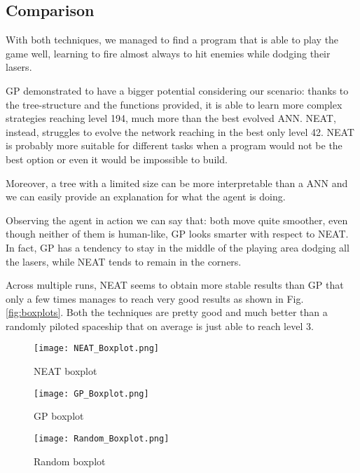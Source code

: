 \subsection{Comparison}
With both techniques, we managed to find a program that is able to play the game well,
learning to fire almost always to hit enemies while dodging their lasers.

GP demonstrated to have a bigger potential considering our scenario: thanks to the
tree-structure and the functions provided, it is able to learn more complex strategies
reaching level 194, much more than the best evolved ANN. NEAT, instead, struggles to
evolve the network reaching in the best only level 42. NEAT is probably more suitable for
different tasks when a program would not be the best option or even it would be impossible
to build.

Moreover, a tree with a limited size can be more interpretable than a ANN and we can easily
provide an explanation for what the agent is doing.

Observing the agent in action we can say that: both move quite smoother, even though
neither of them is human-like, GP looks smarter with respect to NEAT. In fact, GP has a
tendency to stay in the middle of the playing area dodging all the lasers, while NEAT tends to
remain in the corners.

Across multiple runs, NEAT seems to obtain more stable results than GP that only a few
times manages to reach very good results as shown in Fig. \ref{fig:boxplots}. Both the techniques are
pretty good and much better than a randomly piloted spaceship that on average is just able
to reach level 3.


\begin{figure*}
    \centering
    \begin{subfigure}[b]{0.3\textwidth}
        \centering
        \texttt{[image: NEAT\_Boxplot.png]}
        \caption{NEAT boxplot}
    \end{subfigure}
    \hspace{3mm}
    \begin{subfigure}[b]{0.3\textwidth}
        \centering
        \texttt{[image: GP\_Boxplot.png]}
        \caption{GP boxplot}
    \end{subfigure}
    \hspace{3mm}
    \begin{subfigure}[b]{0.3\textwidth}
        \centering
        \texttt{[image: Random\_Boxplot.png]}
        \caption{Random boxplot}
    \end{subfigure}
       \caption{Comparison between the boxplots of NEAT, GP, and randomly piloted spaceships.}
       \label{fig:boxplots}
\end{figure*}\
